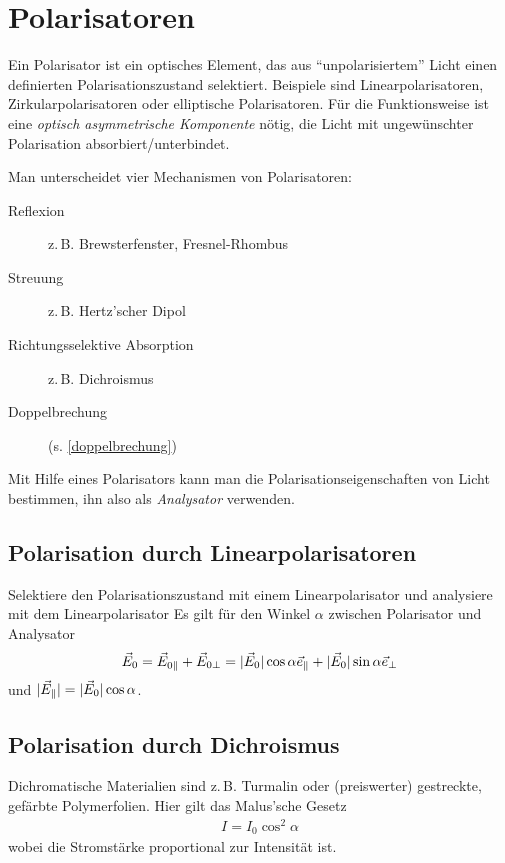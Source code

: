 \section{Polarisatoren}
Ein Polarisator ist ein optisches Element,
das aus \enquote{unpolarisiertem} Licht einen definierten
Polarisationszustand selektiert.
Beispiele sind Linearpolarisatoren, Zirkularpolarisatoren oder
elliptische Polarisatoren.
Für die Funktionsweise ist eine \emph{optisch asymmetrische
  Komponente} nötig,
die Licht mit ungewünschter Polarisation absorbiert/unterbindet.

Man unterscheidet vier Mechanismen von Polarisatoren:
\begin{description}
\item[Reflexion] z.\,B. Brewsterfenster, Fresnel-Rhombus
\item[Streuung] z.\,B. Hertz'scher Dipol
\item[Richtungsselektive Absorption] z.\,B. Dichroismus
\item[Doppelbrechung] (s. \autoref{doppelbrechung})
\end{description}

Mit Hilfe eines Polarisators kann man die Polarisationseigenschaften
von Licht bestimmen, ihn also als \emph{Analysator}
verwenden.


\subsection{Polarisation durch Linearpolarisatoren} 
Selektiere den Polarisationszustand mit einem
Linearpolarisator und analysiere mit dem Linearpolarisator
Es gilt für den Winkel $\alpha$ zwischen Polarisator und Analysator
\begin{gather*}
  \vec{E}_0 = \vec{E}_{0\parallel} + \vec{E}_{0\bot} 
  = |\vec{E}_0|\cos\alpha \vec{e}_\parallel
  + |\vec{E}_0|\sin\alpha \vec{e}_\bot
\end{gather*}
und $|\vec{E}_\parallel| = |\vec{E}_0|\cos\alpha$.



\subsection{Polarisation durch Dichroismus}
Dichromatische Materialien sind z.\,B. Turmalin oder (preiswerter)
gestreckte, gefärbte Polymerfolien.
Hier gilt das Malus'sche Gesetz
\begin{gather*}
  I=I_0\cos^2\alpha
\end{gather*}
wobei die Stromstärke proportional zur Intensität ist.

